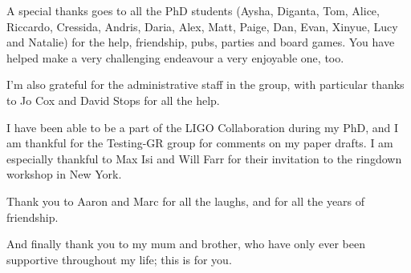 \documentclass[
12pt, %
english, %
doublespacing, %
headsepline, %
]{MastersDoctoralThesis} %
\begin{document}
\begin{singlespacing}
\begin{acknowledgements}
A special thanks goes to all the PhD students (Aysha, Diganta, Tom, Alice, Riccardo, Cressida, Andris, Daria, Alex, Matt, Paige, Dan, Evan, Xinyue, Lucy and Natalie) for the help, friendship, pubs, parties and board games. 
You have helped make a very challenging endeavour a very enjoyable one, too.

I’m also grateful for the administrative staff in the group, with particular thanks to Jo Cox and David Stops for all the help. 

I have been able to be a part of the LIGO Collaboration during my PhD, and I am thankful for the Testing-GR group for comments on my paper drafts. 
I am especially thankful to Max Isi and Will Farr for their invitation to the ringdown workshop in New York.

Thank you to Aaron and Marc for all the laughs, and for all the years of friendship. %

And finally thank you to my mum and brother, who have only ever been supportive throughout my life; this is for you.

\end{acknowledgements}

\end{singlespacing}






\tableofcontents %

\listoffigures %



\end{document}
